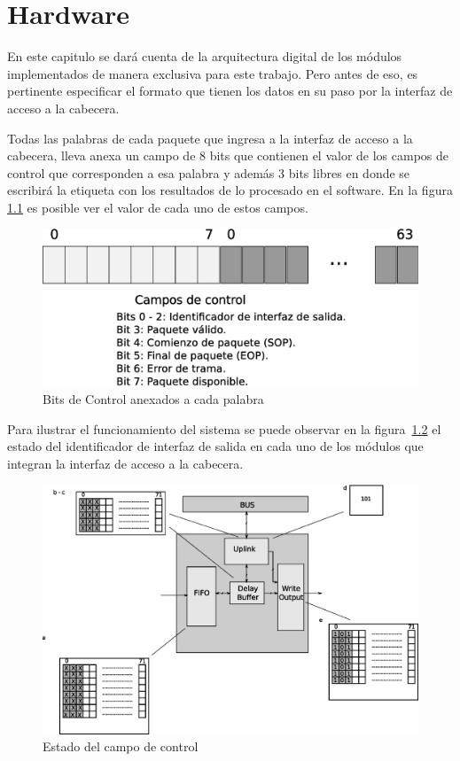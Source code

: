 \chapter{Hardware}

En este capitulo se dará cuenta de la arquitectura digital de los módulos implementados de manera exclusiva para este trabajo. Pero antes de eso, es pertinente especificar el formato que tienen los datos en su paso por la interfaz de acceso a la cabecera.

Todas las palabras de cada paquete que ingresa a la interfaz de acceso a la cabecera, lleva anexa un campo de 8 bits que contienen el valor de los campos de control que corresponden a esa palabra y además 3 bits libres en donde se escribirá la etiqueta con los resultados de lo procesado en el software. En la figura \ref{fig:datocontrol}  es posible ver el valor de cada uno de estos campos.

\begin{figure}[H]
  \centering
	\includegraphics[scale=0.40]{3-arquitectura/graf/datocontrol.eps}
  \caption{Bits de Control anexados a cada palabra}
  \label{fig:datocontrol}
\end{figure}

Para ilustrar el funcionamiento del sistema se puede observar en la figura~\ref{fig:interfaz1} el estado del identificador de interfaz de salida en cada uno de los módulos que integran la interfaz de acceso a la cabecera.

\begin{figure}[H]
  \centering
	\includegraphics[scale=0.60]{3-arquitectura/graf/moduloexp.eps}
  \caption{Estado del campo de control}
  \label{fig:interfaz1}
\end{figure}

